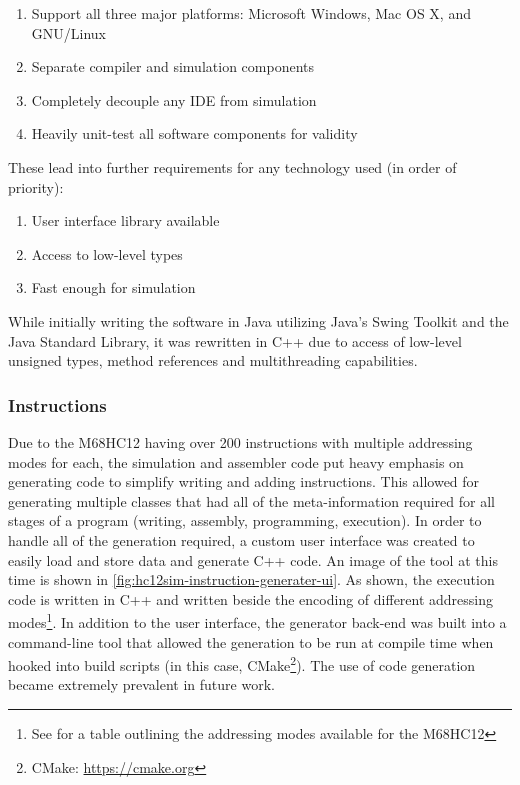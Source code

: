 \begin{enumerate}
    \item Support all three major platforms: Microsoft Windows, Mac OS X, and GNU/Linux
    \item Separate compiler and simulation components
    \item Completely decouple any IDE from simulation
    \item Heavily unit-test all software components for validity
\end{enumerate}

These lead into further requirements for any technology used (in order of priority): 

\begin{enumerate}
    \item User interface library available
    \item Access to low-level types
    \item Fast enough for simulation
\end{enumerate}

While initially writing the software in Java utilizing Java's Swing Toolkit and the Java Standard Library, it was rewritten in C++ due to access of low-level unsigned types, method references and multithreading capabilities.

\subsubsection*{Instructions}
\label{hc12sim:instruction-generation}

Due to the M68HC12 having over 200 instructions with multiple addressing modes for each\cite{hc12Manual2006}, the simulation and assembler code put heavy emphasis on generating code to simplify writing and adding instructions. This allowed for generating multiple classes that had all of the meta-information required for all stages of a program (writing, assembly, programming, execution). In order to handle all of the generation required, a custom user interface was created to easily load and store data and generate C++ code. An image of the tool at this time is shown in \cref{fig:hc12sim-instruction-generater-ui}. As shown, the execution code is written in C++ and written beside the encoding of different addressing modes\footnote{See \cite[Table~3-1,~p.~30]{hc12Manual2006} for a table outlining the addressing modes available for the M68HC12}. In addition to the user interface, the generator back-end was built into a command-line tool that allowed the generation to be run at compile time when hooked into build scripts (in this case, CMake\footnote{CMake: \url{https://cmake.org}}). The use of code generation became extremely prevalent in future work. 

